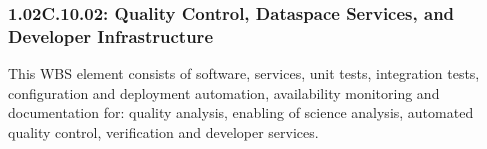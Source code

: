\subsubsection*{1.02C.10.02: Quality Control, Dataspace Services, and Developer Infrastructure}

This WBS element consists of software, services, unit tests, integration tests, configuration and deployment automation, availability monitoring and documentation for: quality analysis, enabling of science analysis, automated quality control, verification and developer services.
